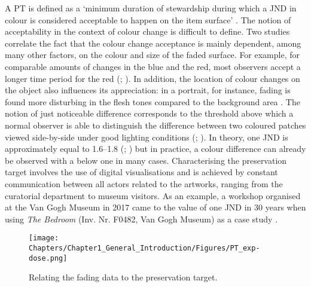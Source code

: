 A \gls{PT} is defined as a ‘minimum duration of stewardship during which a \gls{JND} in colour is considered acceptable to happen on the item surface’ \citep{pesme_setting_2016}. The notion of acceptability in the context of colour change is difficult to define. Two studies correlate the fact that the colour change acceptance is mainly dependent, among many other factors, on the colour and size of the faded surface. For example, for comparable amounts of changes in the blue and the red, most observers accept a longer time period for the red (\citealp[86]{brokerhof_optimum_2008}; \citealp{richardson_acceptable_2007}). In addition, the location of colour changes on the object also influences its appreciation: in a portrait, for instance, fading is found more disturbing in the flesh tones compared to the background area \citep{richardson_acceptable_2007}. The notion of just noticeable difference corresponds to the threshold above which a normal observer is able to distinguish the difference between two coloured patches viewed side-by-side under good lighting conditions (\citealp{crawford_just_1973}; \citealp[note 6]{pesme_presentation_2016}). In theory, one \gls{JND} is approximately equal to 1.6–1.8 \dEOO  (\citealp{michalski_light_2018}; \citealp[21]{cie_technical_committee_3-22_control_2004}) but in practice, a colour difference can already be observed with a \dEOO below one in many cases. Characterising the preservation target involves the use of digital visualisations and is achieved by constant communication between all actors related to the artworks, ranging from the curatorial department to museum visitors. As an example, a workshop organised at the Van Gogh Museum in 2017 came to the value of one \gls{JND} in 30 years when using \textit{The Bedroom} (Inv. Nr. F0482, Van Gogh Museum) as a case study \citep{hendriks_valuing_2017}. \\

\begin{figure*}[!h]
\centering
\texttt{[image: Chapters/Chapter1\_General\_Introduction/Figures/PT\_exp-dose.png]}
\caption[\hspace{0.3cm}Relating the fading data to the preservation target]{Relating the fading data to the preservation target.}
\label{fig:PT}
\end{figure*}

